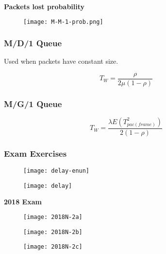 \documentclass[../resumosRCOM.tex]{subfiles}
\begin{document}
\paragraph{}
\textbf{Packets lost probability}

\begin{figure}[H]
    \centering
    \texttt{[image: M-M-1-prob.png]}
\end{figure}

\subsubsection{M/D/1 Queue}

Used when packets have constant size.

\begin{equation}
    T_{W} = \frac{\rho}{2\mu(1-\rho)}
\end{equation}

\subsubsection{M/G/1 Queue}

\begin{equation}
    T_{W} = \frac{\lambda E(T_{pac(frame)}^2)}{2(1-\rho)}
\end{equation}


\subsubsection{Exam Exercises}

\begin{figure}[H]
    \centering
    \texttt{[image: delay-enun]}
\end{figure}

\begin{figure}[H]
    \centering
    \texttt{[image: delay]}
\end{figure}

\textbf{2018 Exam}
\begin{figure}[H]
    \centering
    \texttt{[image: 2018N-2a]}
\end{figure}

\begin{figure}[H]
    \centering
    \texttt{[image: 2018N-2b]}
\end{figure}

\begin{figure}[H]
    \centering
    \texttt{[image: 2018N-2c]}
\end{figure}
\end{document}
